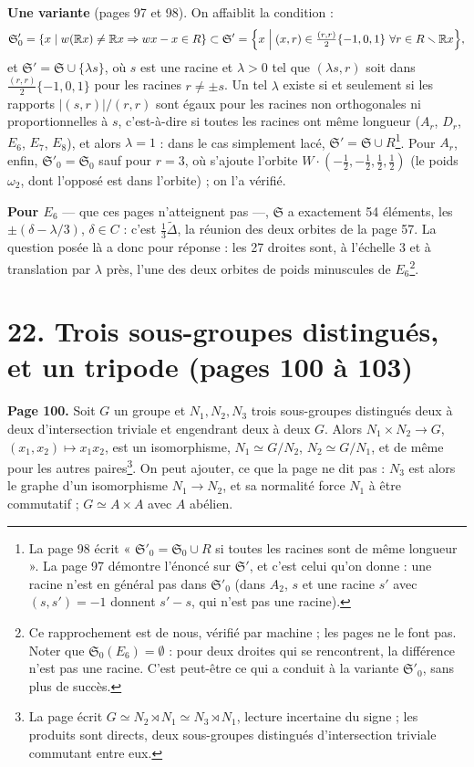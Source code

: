 \documentclass[11pt,a4paper]{article}
\begin{document}
\textbf{Une variante} (pages 97 et 98). On affaiblit la condition :
\[
\mathfrak{S}'_0 = \lbrace x \mid w(\mathbb{R}x) \neq \mathbb{R}x \Rightarrow
wx - x \in R\rbrace \subset \mathfrak{S}' = \Bigl\lbrace x \Bigm| (x, r) \in
\tfrac{(r, r)}{2} \lbrace -1, 0, 1\rbrace \ \forall r \in R \smallsetminus
\mathbb{R}x\Bigr\rbrace ,
\]
et $\mathfrak{S}' = \mathfrak{S} \cup \lbrace \lambda s\rbrace$, où $s$ est une
racine et $\lambda > 0$ tel que $(\lambda s, r)$ soit dans $\tfrac{(r,r)}{2}
\lbrace -1, 0, 1\rbrace$ pour les racines $r \neq \pm s$. Un tel $\lambda$
existe si et seulement si les rapports $|(s, r)|/(r, r)$ sont égaux pour les
racines non orthogonales ni proportionnelles à $s$, c'est-à-dire si toutes les
racines ont même longueur ($A_r$, $D_r$, $E_6$, $E_7$, $E_8$), et alors
$\lambda = 1$ : dans le cas simplement lacé, $\mathfrak{S}' = \mathfrak{S}
\cup R$\footnote{La page 98 écrit « $\mathfrak{S}'_0 = \mathfrak{S}_0 \cup R$
si toutes les racines sont de même longueur ». La page 97 démontre
l'énoncé sur $\mathfrak{S}'$, et c'est celui qu'on donne : une racine n'est
en général pas dans $\mathfrak{S}'_0$ (dans $A_2$, $s$ et une racine $s'$ avec
$(s, s') = -1$ donnent $s' - s$, qui n'est pas une racine).}. Pour $A_r$, enfin,
$\mathfrak{S}'_0 = \mathfrak{S}_0$ sauf pour $r = 3$, où s'ajoute l'orbite
$W \cdot (-\tfrac12, -\tfrac12, \tfrac12, \tfrac12)$ (le poids $\omega_2$,
dont l'opposé est dans l'orbite) ; on l'a vérifié.

\textbf{Pour $E_6$} --- que ces pages n'atteignent pas ---, $\mathfrak{S}$ a
exactement 54 éléments, les $\pm(\delta - \lambda/3)$, $\delta \in C$ : c'est
$\tfrac13 \widetilde\Delta$, la réunion des deux orbites de la page 57. La
question posée là a donc pour réponse : les 27 droites sont, à l'échelle $3$
et à translation par $\lambda$ près, l'une des deux orbites de poids minuscules
de $E_6$\footnote{Ce rapprochement est de nous, vérifié par machine ; les
pages ne le font pas. Noter que $\mathfrak{S}_0(E_6) = \emptyset$ : pour
deux droites qui se rencontrent, la différence n'est pas une racine. C'est
peut-être ce qui a conduit à la variante $\mathfrak{S}'_0$, sans plus de
succès.}.

\section*{22. Trois sous-groupes distingués, et un tripode (pages 100 à 103)}

\textbf{Page 100.} Soit $G$ un groupe et $N_1, N_2, N_3$ trois sous-groupes
distingués deux à deux d'intersection triviale et engendrant deux à deux $G$.
Alors $N_1 \times N_2 \to G$, $(x_1, x_2) \mapsto x_1 x_2$, est un isomorphisme,
$N_1 \simeq G/N_2$, $N_2 \simeq G/N_1$, et de même pour les autres
paires\footnote{La page écrit $G \simeq N_2 \rtimes N_1 \simeq N_3 \rtimes
N_1$, lecture incertaine du signe ; les produits sont directs, deux
sous-groupes distingués d'intersection triviale commutant entre eux.}. On peut
ajouter, ce que la page ne dit pas : $N_3$ est alors le graphe d'un
isomorphisme $N_1 \to N_2$, et sa normalité force $N_1$ à être commutatif ;
$G \simeq A \times A$ avec $A$ abélien.
\end{document}

